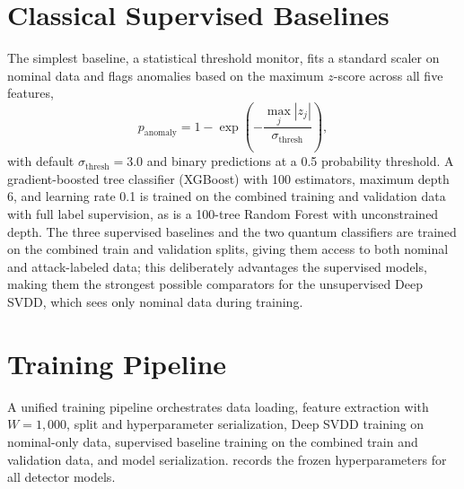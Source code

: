 \documentclass[12pt, a4paper]{report}
\begin{document}
\section{Classical Supervised Baselines}\label{sec:classical}
The simplest baseline, a statistical threshold monitor, fits a standard scaler on nominal data and flags anomalies based on the maximum $z$-score across all five features,
\begin{equation}
    p_{\text{anomaly}} = 1 - \exp\!\left(-\frac{\max_j |z_j|}{\sigma_{\text{thresh}}}\right),
\end{equation}
with default $\sigma_{\text{thresh}} = 3.0$ and binary predictions at a 0.5 probability threshold. A gradient-boosted tree classifier (XGBoost) with 100 estimators, maximum depth 6, and learning rate 0.1 is trained on the combined training and validation data with full label supervision, as is a 100-tree Random Forest with unconstrained depth. The three supervised baselines and the two quantum classifiers are trained on the combined train and validation splits, giving them access to both nominal and attack-labeled data; this deliberately advantages the supervised models, making them the strongest possible comparators for the unsupervised Deep SVDD, which sees only nominal data during training.

\section{Training Pipeline}\label{sec:training}
A unified training pipeline orchestrates data loading, feature extraction with $W = 1{,}000$, split and hyperparameter serialization, Deep SVDD training on nominal-only data, supervised baseline training on the combined train and validation data, and model serialization.  records the frozen hyperparameters for all detector models.
\end{document}
